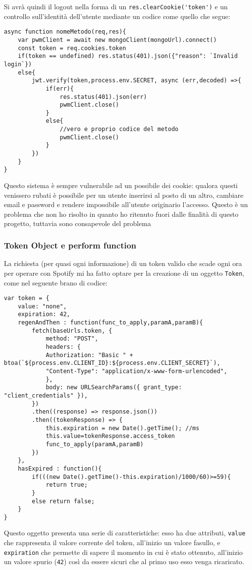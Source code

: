 Si avrà quindi il logout nella forma di un \verb|res.clearCookie('token')| e un controllo sull'identità dell'utente mediante un codice come quello che segue:
\begin{lstlisting}
async function nomeMetodo(req,res){
    var pwmClient = await new mongoClient(mongoUrl).connect()
    const token = req.cookies.token
    if(token == undefined) res.status(401).json({"reason": `Invalid login`})
    else{
        jwt.verify(token,process.env.SECRET, async (err,decoded) =>{
            if(err){
                res.status(401).json(err)
                pwmClient.close()
            }
            else{
                //vero e proprio codice del metodo
                pwmClient.close()
            }
        })
    }
}
\end{lstlisting}
\alert{Questo sistema è sempre vulnerabile ad un possibile  dei cookie: qualora questi venissero rubati è possibile per un utente inserirsi al posto di un altro, cambiare email e password e rendere impossibile all'utente originario l'accesso. Questo è un problema che non ho risolto in quanto ho ritenuto fuori dalle finalità di questo progetto, tuttavia sono consapevole del problema}
\subsubsection{Token Object e perform function}
La richiesta (per quasi ogni informazione) di un token valido che scade ogni ora per operare con Spotify mi ha fatto optare per la creazione di un oggetto \verb|Token|, come nel seguente brano di codice:
\begin{lstlisting}
var token = {
    value: "none",
    expiration: 42,
    regenAndThen : function(func_to_apply,paramA,paramB){
        fetch(baseUrls.token, {
            method: "POST",
            headers: {
            Authorization: "Basic " + btoa(`${process.env.CLIENT_ID}:${process.env.CLIENT_SECRET}`),
            "Content-Type": "application/x-www-form-urlencoded",
            },
            body: new URLSearchParams({ grant_type: "client_credentials" }),
        })
        .then((response) => response.json())
        .then((tokenResponse) => {
            this.expiration = new Date().getTime(); //ms
            this.value=tokenResponse.access_token
            func_to_apply(paramA,paramB)
        })                   
    },
    hasExpired : function(){
        if(((new Date().getTime()-this.expiration)/1000/60)>=59){
            return true;
        }
        else return false;
    }
}
\end{lstlisting}
Questo oggetto presenta una serie di caratteristiche: esso ha due attributi, \verb|value| che rappresenta il valore corrente del token, all'inizio un valore fasullo, e \verb|expiration| che permette di sapere il momento in cui è stato ottenuto, all'inizio un valore spurio (\verb|42|) così da essere sicuri che al primo uso esso venga ricaricato.

